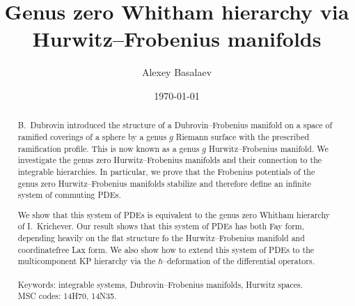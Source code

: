 \documentclass[12pt,a4paper]{amsart}
\newcommand{\<}{\left<}
\renewcommand{\>}{\right>}
\numberwithin{equation}{section}
\begin{document}
\title{
Genus zero Whitham hierarchy via Hurwitz--Frobenius manifolds
}

\author{Alexey Basalaev}
\address{A. Basalaev:
\newline 
Faculty of Mathematics, HSE University, Usacheva str., 6, 119048 Moscow, Russian Federation
}

\date{\today}

 \begin{abstract}
 B.~Dubrovin introduced the structure of a Dubrovin--Frobenius manifold on a space of ramified coverings of a sphere by a genus $g$ Riemann surface with the prescribed ramification profile. This is now known as a genus $g$ Hurwitz--Frobenius manifold.
 We investigate the genus zero Hurwitz--Frobenius manifolds and their connection to the integrable hierarchies. In particular, we prove that the Frobenius potentials of the genus zero Hurwitz--Frobenius manifolds stabilize and therefore define an infinite system of commuting PDEs.

 We show that this system of PDEs is equivalent to the genus zero Whitham hierarchy of I.~Krichever.
 Our result shows that this system of PDEs has both Fay form, depending heavily on the flat structure fo the Hurwitz--Frobenius manifold and coordinatefree Lax form. We also show how to extend this system of PDEs to the multicomponent KP hierarchy via the $\hbar$--deformation of the differential operators.
 \\
 \\
 Keywords: integrable systems, Dubrovin--Frobenius manifolds, Hurwitz spaces.
 \\
 MSC codes: 14H70, 14N35.
 \end{abstract}
 \maketitle

 
\end{document}
